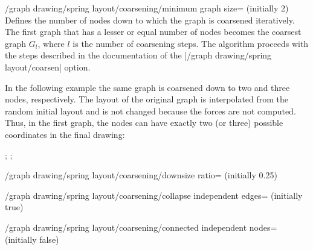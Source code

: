 \begin{key}{/graph drawing/spring layout/coarsening/minimum graph
  size= (initially 2)}
  Defines the number of nodes down to which the graph is coarsened
  iteratively. The first graph that has a lesser or equal number of
  nodes becomes the coarsest graph $G_l$, where $l$ is the number of
  coarsening steps. The algorithm proceeds with the steps described in
  the documentation of the |/graph drawing/spring layout/coarsen|
  option.

  In the following example the same graph is coarsened down to two
  and three nodes, respectively. The layout of the original graph is 
  interpolated from the random initial layout and is not changed
  because the forces are not computed. Thus, in the first graph, the
  nodes can have exactly two (or three) possible coordinates in the
  final drawing:
  \begin{codeexample}[]
\tikz {};
\tikz {};
  \end{codeexample}
\end{key}

\begin{key}{/graph drawing/spring layout/coarsening/downsize
  ratio= (initially 0.25)}
\end{key}

\begin{key}{/graph drawing/spring layout/coarsening/collapse independent
  edges= (initially true)}
\end{key}

\begin{key}{/graph drawing/spring layout/coarsening/connected
  independent nodes= (initially false)}
\end{key}

